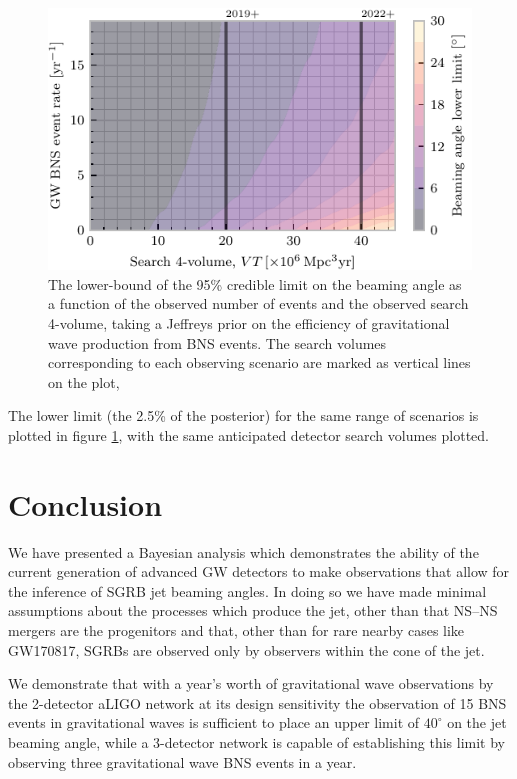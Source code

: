 \documentclass[twocolumn,nofootinbib]{revtex4-1}
\newcommand{\BNS}{\ac{NS}--\ac{NS}\xspace}
\begin{document}
\begin{figure}
\centering
\includegraphics[width=\linewidth]{volume_v_nevents_lower.pdf}
\caption{\label{fig:volumevevents_lower} The lower-bound of the 95\%
  credible limit on the beaming angle as a function of the observed
  number of events and the observed search 4-volume, taking a Jeffreys
  prior on the efficiency of gravitational wave production from BNS
  events. The search volumes corresponding to each observing scenario
  are marked as vertical lines on the plot, }
\end{figure}

The lower limit (the 2.5\% of the posterior) for the same range of
scenarios is plotted in figure \ref{fig:volumevevents_lower}, with the
same anticipated detector search volumes plotted.

\section{Conclusion}

We have presented a Bayesian analysis which demonstrates the ability
of the current generation of advanced \ac{GW} detectors to make observations
that allow for the inference of \ac{SGRB} jet beaming angles. In doing so we
have made minimal assumptions about the processes which produce the jet, other
than that \BNS mergers are the progenitors and that, other than for rare nearby
cases like GW170817, \acp{SGRB} are observed only by observers within the cone
of the jet.

We demonstrate that with a year's worth of gravitational wave
observations by the 2-detector \ac{aLIGO} network at its design
sensitivity the observation of 15 BNS events in gravitational waves is
sufficient to place an upper limit of $40^{\circ}$ on the jet beaming
angle, while a 3-detector network is capable of establishing this
limit by observing three gravitational wave BNS events in a year.
\end{document}
